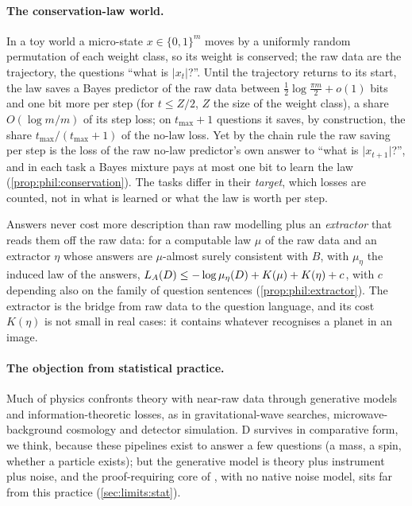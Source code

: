 \paragraph{The conservation-law world.}
In a toy world a micro-state $x\in\{0,1\}^m$ moves by a uniformly random permutation of each weight class, so its weight is conserved; the raw data are the trajectory, the questions ``what is $\lvert x_t\rvert$?''. Until the trajectory returns to its start, the law saves a Bayes predictor of the raw data between $\frac12\log\frac{\pi m}2+o(1)$ bits and one bit more per step (for $t\le Z/2$, $Z$ the size of the weight class), a share $O(\log m/m)$ of its step loss; on $t_{\max}+1$ questions it saves, by construction, the share $t_{\max}/(t_{\max}+1)$ of the no-law loss. Yet by the chain rule the raw saving per step is the loss of the raw no-law predictor's own answer to ``what is $\lvert x_{t+1}\rvert$?'', and in each task a Bayes mixture pays at most one bit to learn the law (\cref{prop:phil:conservation}). The tasks differ in their \emph{target}, which losses are counted, not in what is learned or what the law is worth per step.

Answers never cost more description than raw modelling plus an \emph{extractor} that reads them off the raw data: for a computable law $\mu$ of the raw data and an extractor $\eta$ whose answers are $\mu$-almost surely consistent with $B$, with $\mu_\eta$ the induced law of the answers, $L_{A}(D)\le-\log\mu_\eta(D)+K(\mu)+K(\eta)+c$, with $c$ depending also on the family of question sentences (\cref{prop:phil:extractor}). The extractor is the bridge from raw data to the question language, and its cost $K(\eta)$ is not small in real cases: it contains whatever recognises a planet in an image.

\paragraph{The objection from statistical practice.}\label{rem:phil:practice}
Much of physics confronts theory with near-raw data through generative models and information-theoretic losses, as in gravitational-wave searches, microwave-background cosmology and detector simulation. D survives in comparative form, we think, because these pipelines exist to answer a few questions (a mass, a spin, whether a particle exists); but the generative model is theory plus instrument plus noise, and the proof-requiring core of \SAIabbr, with no native noise model, sits far from this practice (\cref{sec:limits:stat}).


